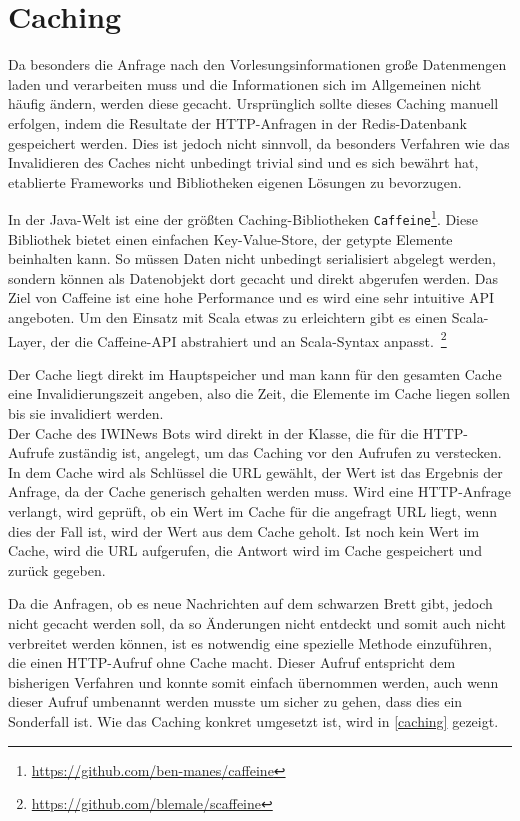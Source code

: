 \section{Caching}
Da besonders die Anfrage nach den Vorlesungsinformationen große Datenmengen laden und verarbeiten muss und die Informationen sich im Allgemeinen nicht häufig ändern, werden diese gecacht. Ursprünglich sollte dieses Caching manuell erfolgen, indem die Resultate der HTTP-Anfragen in der Redis-Datenbank gespeichert werden. Dies ist jedoch nicht sinnvoll, da besonders Verfahren wie das Invalidieren des Caches nicht unbedingt trivial sind und es sich bewährt hat, etablierte Frameworks und Bibliotheken eigenen Lösungen zu bevorzugen.

In der Java-Welt ist eine der größten Caching-Bibliotheken \texttt{Caffeine}\footnote{\url{https://github.com/ben-manes/caffeine}}. Diese Bibliothek bietet einen einfachen Key-Value-Store, der getypte Elemente beinhalten kann. So müssen Daten nicht unbedingt serialisiert abgelegt werden, sondern können als Datenobjekt dort gecacht und direkt abgerufen werden. Das Ziel von Caffeine ist eine hohe Performance und es wird eine sehr intuitive API angeboten. Um den Einsatz mit Scala etwas zu erleichtern gibt es einen Scala-Layer, der die Caffeine-API abstrahiert und an Scala-Syntax anpasst.~\footnote{\url{https://github.com/blemale/scaffeine}}

Der Cache liegt direkt im Hauptspeicher und man kann für den gesamten Cache eine Invalidierungszeit angeben, also die Zeit, die Elemente im Cache liegen sollen bis sie invalidiert werden.\\
Der Cache des IWINews Bots wird direkt in der Klasse, die für die HTTP-Aufrufe zuständig ist, angelegt, um das Caching vor den Aufrufen zu verstecken. In dem Cache wird als Schlüssel die URL gewählt, der Wert ist das Ergebnis der Anfrage, da der Cache generisch gehalten werden muss. Wird eine HTTP-Anfrage verlangt, wird geprüft, ob ein Wert im Cache für die angefragt URL liegt, wenn dies der Fall ist, wird der Wert aus dem Cache geholt. Ist noch kein Wert im Cache, wird die URL aufgerufen, die Antwort wird im Cache gespeichert und zurück gegeben.

\newpage
Da die Anfragen, ob es neue Nachrichten auf dem schwarzen Brett gibt, jedoch nicht gecacht werden soll, da so Änderungen nicht entdeckt und somit auch nicht verbreitet werden können, ist es notwendig eine spezielle Methode einzuführen, die einen HTTP-Aufruf ohne Cache macht. Dieser Aufruf entspricht dem bisherigen Verfahren und konnte somit einfach übernommen werden, auch wenn dieser Aufruf umbenannt werden musste um sicher zu gehen, dass dies ein Sonderfall ist. Wie das Caching konkret umgesetzt ist, wird in \autoref{caching} gezeigt.


